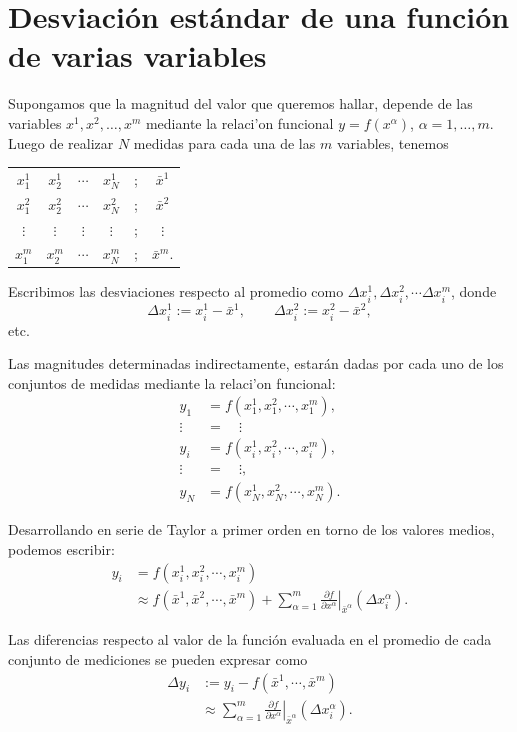 \chapter{Desviación estándar de una función de varias variables}\label{sec:propdesv}

Supongamos que la magnitud del valor que queremos hallar, depende de las variables $x^1, x^2, \dots, x^m$  mediante la relaci'on funcional $y=f(x^\alpha)$, $\alpha=1,\dots,m$. Luego de realizar $N$ medidas para cada una de las $m$ variables, tenemos
\begin{center}
\begin{tabular}{cccccc}
$x^1_1$ & $x^1_2$ & $\cdots$ & $x^1_N$ & ; & $\bar{x}^1$ \\ 
$x^2_1$ & $x^2_2$ & $\cdots$ & $x^2_N$ & ; & $\bar{x}^2$ \\ 
$\vdots$ & $\vdots$ & $\vdots$ & $\vdots$ & ; & $\vdots$ \\ 
$x^m_1$ & $x^m_2$ & $\cdots$ & $x^m_N$ & ; & $\bar{x}^m$.
\end{tabular} 
\end{center}
Escribimos las desviaciones respecto al promedio como $\Delta x^1_i, \Delta x^2_i, \cdots \Delta x^m_i$, donde
\begin{equation}
\Delta x^1_i:=x_i^1-\bar{x}^1, \qquad \Delta x^2_i:=x_i^2-\bar{x}^2,
\end{equation}
etc.

Las magnitudes determinadas indirectamente, estarán dadas por cada uno de los conjuntos de medidas mediante la relaci'on funcional:
\begin{align}
y_1 &= f(x^1_1,x^2_1,\cdots, x^m_1), \\
\vdots &= \quad\vdots  \\
y_i &= f(x^1_i,x^2_i,\cdots, x^m_i),\\
\vdots &= \quad \vdots,  \\
y_N &= f(x^1_N,x^2_N,\cdots, x^m_N).
\end{align}

Desarrollando en serie de Taylor a primer orden en torno de los valores medios, podemos escribir:
\begin{align}
y_i & = f(x^1_i,x^2_i,\cdots, x^m_i)\\
&\approx  f(\bar{x}^1,\bar{x}^2,\cdots, \bar{x}^m)+ \sum_{\alpha=1}^m\left.\frac{\partial f}{\partial x^\alpha}\right|_{\bar{x}^\alpha}(\Delta x^\alpha_i).
\end{align}

Las diferencias respecto al valor de la función evaluada en el promedio de cada conjunto de mediciones se pueden expresar como
\begin{align}
\Delta y_i &:= y_i-f(\bar{x}^1,\cdots, \bar{x}^m)\\
&\approx  \sum_{\alpha=1}^m\left.\frac{\partial f}{\partial x^\alpha}\right|_{\bar{x}^\alpha}(\Delta x^\alpha_i).
\end{align}

